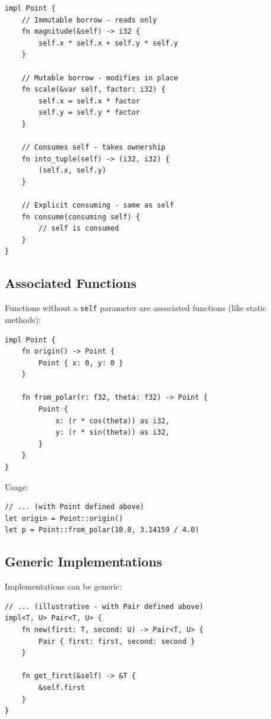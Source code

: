 \begin{lstlisting}
impl Point {
    // Immutable borrow - reads only
    fn magnitude(&self) -> i32 {
        self.x * self.x + self.y * self.y
    }

    // Mutable borrow - modifies in place
    fn scale(&var self, factor: i32) {
        self.x = self.x * factor
        self.y = self.y * factor
    }

    // Consumes self - takes ownership
    fn into_tuple(self) -> (i32, i32) {
        (self.x, self.y)
    }

    // Explicit consuming - same as self
    fn consume(consuming self) {
        // self is consumed
    }
}
\end{lstlisting}

\subsection{Associated Functions}

Functions without a \texttt{self} parameter are associated functions (like static methods):

\begin{lstlisting}
impl Point {
    fn origin() -> Point {
        Point { x: 0, y: 0 }
    }

    fn from_polar(r: f32, theta: f32) -> Point {
        Point {
            x: (r * cos(theta)) as i32,
            y: (r * sin(theta)) as i32,
        }
    }
}
\end{lstlisting}

Usage:

\begin{lstlisting}
// ... (with Point defined above)
let origin = Point::origin()
let p = Point::from_polar(10.0, 3.14159 / 4.0)
\end{lstlisting}

\subsection{Generic Implementations}

Implementations can be generic:

\begin{lstlisting}
// ... (illustrative - with Pair defined above)
impl<T, U> Pair<T, U> {
    fn new(first: T, second: U) -> Pair<T, U> {
        Pair { first: first, second: second }
    }

    fn get_first(&self) -> &T {
        &self.first
    }
}
\end{lstlisting}

